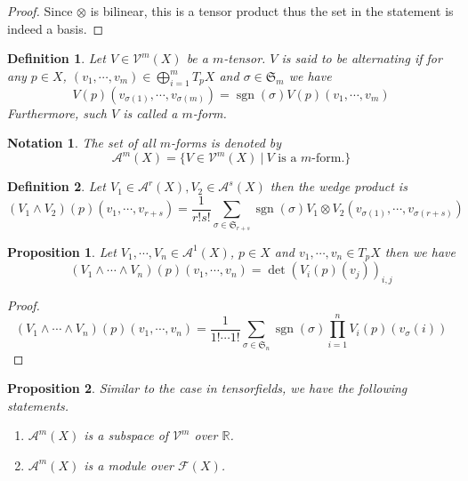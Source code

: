 \documentclass{article}
\newtheorem{proposition}{Proposition}[section]
\newtheorem{definition}{Definition}[section]
\newtheorem{notation}{Notation}[section]
\numberwithin{equation}{section}
\DeclareMathOperator{\sgn}{sgn}
\begin{document}
\begin{proof}
Since $\otimes$ is bilinear, this is a tensor product thus the set in the statement is indeed a basis.
\end{proof}

\begin{definition}
Let $V\in\mathcal{V}^m(X)$ be a $m$-tensor. $V$ is said to be alternating if for any $p\in X$, $(v_1,\cdots,v_m)\in\bigoplus_{i=1}^m T_pX$ and $\sigma\in\mathfrak{S}_m$ we have
\begin{equation*}
V(p)(v_{\sigma(1)},\cdots,v_{\sigma(m)})=\sgn(\sigma)V(p)(v_1,\cdots,v_m)
\end{equation*}
Furthermore, such $V$ is called a $m$-form.
\end{definition}

\begin{notation}
The set of all $m$-forms is denoted by
\begin{equation*}
\mathcal{A}^m(X)=\{V\in\mathcal{V}^m(X)\:|\: V \text{ is a $m$-form.}\}
\end{equation*}
\end{notation}

\begin{definition}
Let $V_1\in\mathcal{A}^r(X),V_2\in\mathcal{A}^s(X)$ then the wedge product is 
\begin{equation*}
(V_1\wedge V_2)(p)(v_1,\cdots,v_{r+s}) = {\frac 1 {r!s!}}\sum_{\sigma\in\mathfrak{S}_{r+s}}\sgn(\sigma)V_1\otimes V_2(v_{\sigma(1)},\cdots,v_{\sigma(r+s)})
\end{equation*}
\end{definition}

\begin{proposition}
\label{sec:det_wedge}
Let $V_1,\cdots,V_n\in\mathcal{A}^1(X)$, $p\in X$ and $v_1,\cdots,v_n\in T_pX$ then we have
\begin{equation*}
(V_1\wedge\cdots\wedge V_n)(p)(v_1,\cdots,v_n) = \det(V_i(p)(v_j))_{i,j}
\end{equation*}
\end{proposition}

\begin{proof}
\begin{equation*}
(V_1\wedge\cdots\wedge V_n)(p)(v_1,\cdots,v_{n}) = {\frac 1 {1!\cdots 1!}}\sum_{\sigma\in\mathfrak{S}_{n}}\sgn(\sigma)\prod_{i=1}^nV_i(p)(v_\sigma(i))
\end{equation*}
\end{proof}

\begin{proposition}Similar to the case in tensorfields, we have the following statements.
\begin{enumerate}
\item $\mathcal{A}^m(X)$ is a subspace of $\mathcal{V}^m$ over $\mathbb{R}$.
\item $\mathcal{A}^m(X)$ is a module over $\mathcal{F}(X)$. 
\end{enumerate}
\end{proposition}
\end{document}
